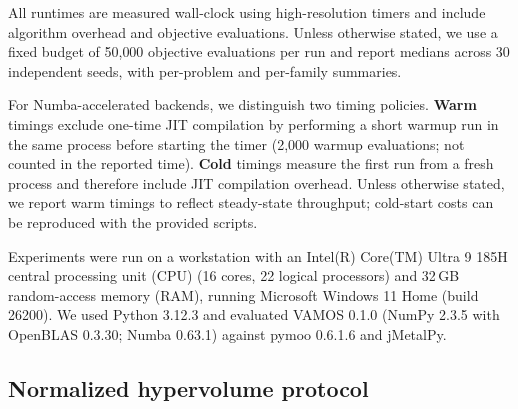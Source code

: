 \documentclass[journal]{IEEEtran}
\newcommand{\VAMOS}{VAMOS}
\begin{document}
All runtimes are measured wall-clock using high-resolution timers and include algorithm overhead and objective evaluations. Unless otherwise stated, we use a fixed budget of 50{,}000 objective evaluations per run and report medians across 30 independent seeds, with per-problem and per-family summaries.

For Numba-accelerated backends, we distinguish two timing policies. \textbf{Warm} timings exclude one-time JIT compilation by performing a short warmup run in the same process before starting the timer (2{,}000 warmup evaluations; not counted in the reported time). \textbf{Cold} timings measure the first run from a fresh process and therefore include JIT compilation overhead. Unless otherwise stated, we report warm timings to reflect steady-state throughput; cold-start costs can be reproduced with the provided scripts.

Experiments were run on a workstation with an Intel(R) Core(TM) Ultra 9 185H central processing unit (CPU) (16 cores, 22 logical processors) and 32\,GB random-access memory (RAM), running Microsoft Windows 11 Home (build 26200). We used Python 3.12.3 and evaluated \VAMOS{} 0.1.0 (NumPy 2.3.5 with OpenBLAS 0.3.30; Numba 0.63.1) against pymoo 0.6.1.6 and jMetalPy.

\subsection{Normalized hypervolume protocol}
\label{sec:hv}
\end{document}
